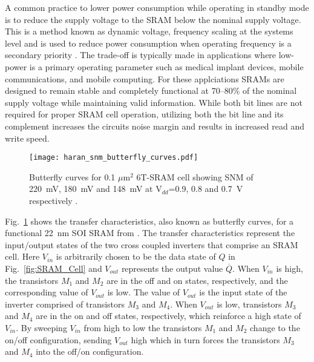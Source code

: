 A common practice to lower power consumption while operating in standby mode is to reduce the supply voltage to the SRAM below the nominal supply voltage.
This is a method known as dynamic voltage, frequency scaling at the systems level and is used to reduce power consumption when operating frequency is a secondary priority \cite{semeraro:2002dvfs,david:2011dvfs}.
The trade-off is typically made in applications where low-power is a primary operating parameter such as medical implant devices, mobile communications, and mobile computing.
For these applciations SRAMs are designed to remain stable and completely functional at 70--80\% of the nominal supply voltage while maintaining valid information.
While both bit lines are not required for proper SRAM cell operation, utilizing both the bit line and its complement increases the circuits noise margin and results in increased read and write speed.

\begin{figure}[htbp]
    \begin{center}
        \texttt{[image: haran\_snm\_butterfly\_curves.pdf]}
    \end{center}
    \caption[Butterfly curves for 0.1 $\mu$m$^2$ 6T-SRAM cell showing SNM of 220~mV, 180~mV and 148~mV at V$_{dd}$=0.9, 0.8 and 0.7~V respectively.]{Butterfly curves for 0.1 $\mu$m$^2$ 6T-SRAM cell showing SNM of 220~mV, 180~mV and 148~mV at V$_{dd}$=0.9, 0.8 and 0.7~V respectively \cite{Haran:2008ta}.}
    \label{fig:22nm_soi_sram_butterfly_curve_snm}
\end{figure}

Fig.~\ref{fig:22nm_soi_sram_butterfly_curve_snm} shows the transfer characteristics, also known as butterfly curves, for a functional 22~nm SOI SRAM from \cite{Haran:2008ta}.
The transfer characteristics represent the input/output states of the two cross coupled inverters that comprise an SRAM cell.
Here $V_{in}$ is arbitrarily chosen to be the data state of $Q$ in Fig.~\ref{fig:SRAM_Cell} and $V_{out}$ represents the output value $\overline{Q}$. 
When $V_{in}$ is high, the transistors $M_1$ and $M_2$ are in the off and on states, respectively, and the corresponding value of $V_{out}$ is low.
The value of $V_{out}$ is the input state of the inverter comprised of transistors $M_3$ and $M_4$. 
When $V_{out}$ is low, transistors $M_3$ and $M_4$ are in the on and off states, respectively, which reinforce a high state of $V_{in}$.
By sweeping $V_{in}$ from high to low the transistors $M_1$ and $M_2$ change to the on/off configuration, sending $V_{out}$ high which in turn forces the transistors $M_3$ and $M_4$ into the off/on configuration.

